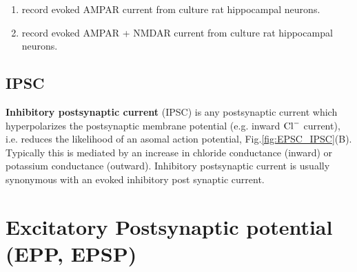 \begin{enumerate}
  
  \item record evoked AMPAR current from
  culture rat hippocampal neurons.
  
  \item record evoked AMPAR + NMDAR current from culture rat hippocampal
  neurons.
  
\end{enumerate}

\subsection{IPSC}
\label{sec:IPSC}

{\bf Inhibitory postsynaptic current} (IPSC) is any postsynaptic current which
hyperpolarizes the postsynaptic membrane potential (e.g. inward ${\text{Cl}^{-}}$ current),
i.e. reduces the likelihood of an asomal action potential,
Fig.\ref{fig:EPSC_IPSC}(B).
Typically this is mediated by an increase in chloride conductance  (inward) or
potassium conductance (outward). Inhibitory postsynaptic current is usually
synonymous with an evoked inhibitory post synaptic current.


\section{Excitatory Postsynaptic potential (EPP, EPSP)}
\label{sec:excitatory_postsynaptic_potential}


